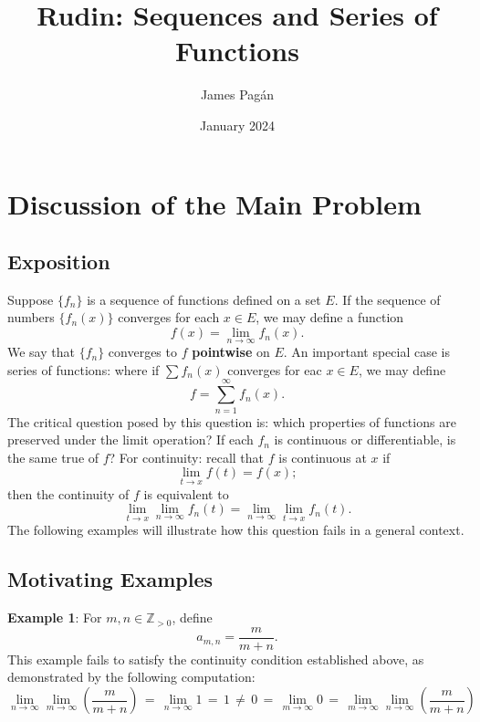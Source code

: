 \documentclass[11pt]{article}
\title{Rudin: Sequences and Series of Functions}
\author{James Pagán}
\date{January 2024}
\begin{document}
\maketitle
\tableofcontents
\newpage


\section{Discussion of the Main Problem}


\subsection{Exposition}

Suppose $\{ f_{n} \}$ is a sequence of functions defined on a set $E$. If the sequence of numbers $\{ f_{n}(x) \}$ converges for each $x \in E$, we may define a function
\[
	f(x) = \lim\limits_{n \to \infty} f_{n}(x).
\]
We say that $\{ f_{n} \}$ converges to $f$ \textbf{pointwise} on $E$. An important special case is series of functions: where if $\sum f_{n}(x)$ converges for eac $x \in E$, we may define
\[
	f = \sum\limits_{n = 1}^{\infty} f_{n}(x).
\]
The critical question posed by this question is: which properties of functions are preserved under the limit operation? If each $f_{n}$ is continuous or differentiable, is the same true of $f$? For continuity: recall that $f$ is continuous at $x$ if
\[
	\lim\limits_{t \to x} f(t) = f(x);
\]
then the continuity of $f$ is equivalent to
\[
	\lim\limits_{t \to x} \lim\limits_{n \to \infty} f_{n}(t) = \lim\limits_{n \to \infty} \lim\limits_{t \to x} f_{n} (t).
\]
The following examples will illustrate how this question fails in a general context.


\subsection{Motivating Examples}

\textbf{Example 1}: For $m, n \in \mathbb{Z}_{> 0}$, define
\[
	a_{m, n} = \frac{m}{m + n}.
\]
This example fails to satisfy the continuity condition established above, as demonstrated by the following computation:
\[
	\lim\limits_{n \to \infty} \lim\limits_{m \to \infty} \left( \frac{m}{m + n} \right) \, = \, \lim\limits_{n \to \infty} 1 \, = \, 1 \, \ne \, 0 \, = \, \lim\limits_{m \to \infty} 0 \, = \, \lim\limits_{m \to \infty} \lim\limits_{n \to \infty} \left( \frac{m}{m + n} \right)
\]
\end{document}
